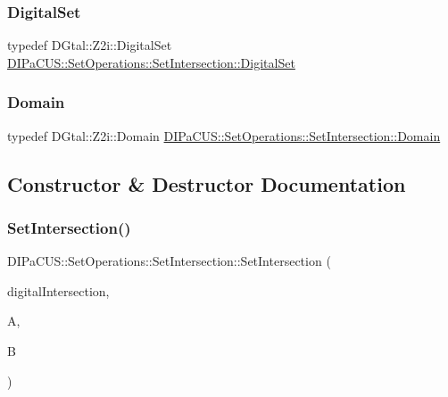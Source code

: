 \subsubsection{\texorpdfstring{Digital\+Set}{DigitalSet}}
{\footnotesize\ttfamily typedef D\+Gtal\+::\+Z2i\+::\+Digital\+Set \mbox{\hyperlink{structDIPaCUS_1_1SetOperations_1_1SetIntersection_a30ae8d2238ec7e463abf64bba651e28f}{D\+I\+Pa\+C\+U\+S\+::\+Set\+Operations\+::\+Set\+Intersection\+::\+Digital\+Set}}}

\mbox{\label{structDIPaCUS_1_1SetOperations_1_1SetIntersection_a8b92555f5234943ea064906c2590d17c}} 
\subsubsection{\texorpdfstring{Domain}{Domain}}
{\footnotesize\ttfamily typedef D\+Gtal\+::\+Z2i\+::\+Domain \mbox{\hyperlink{structDIPaCUS_1_1SetOperations_1_1SetIntersection_a8b92555f5234943ea064906c2590d17c}{D\+I\+Pa\+C\+U\+S\+::\+Set\+Operations\+::\+Set\+Intersection\+::\+Domain}}}



\subsection{Constructor \& Destructor Documentation}
\mbox{\label{structDIPaCUS_1_1SetOperations_1_1SetIntersection_a52d3fd52c21e7eb9cd4d5ce16cf80fbb}} 
\subsubsection{\texorpdfstring{Set\+Intersection()}{SetIntersection()}}
{\footnotesize\ttfamily D\+I\+Pa\+C\+U\+S\+::\+Set\+Operations\+::\+Set\+Intersection\+::\+Set\+Intersection (\begin{DoxyParamCaption}\item[{\mbox{\hyperlink{structDIPaCUS_1_1SetOperations_1_1SetIntersection_a30ae8d2238ec7e463abf64bba651e28f}{Digital\+Set}} \&}]{digital\+Intersection,  }\item[{const \mbox{\hyperlink{structDIPaCUS_1_1SetOperations_1_1SetIntersection_a30ae8d2238ec7e463abf64bba651e28f}{Digital\+Set}} \&}]{A,  }\item[{const \mbox{\hyperlink{structDIPaCUS_1_1SetOperations_1_1SetIntersection_a30ae8d2238ec7e463abf64bba651e28f}{Digital\+Set}} \&}]{B }\end{DoxyParamCaption})}




